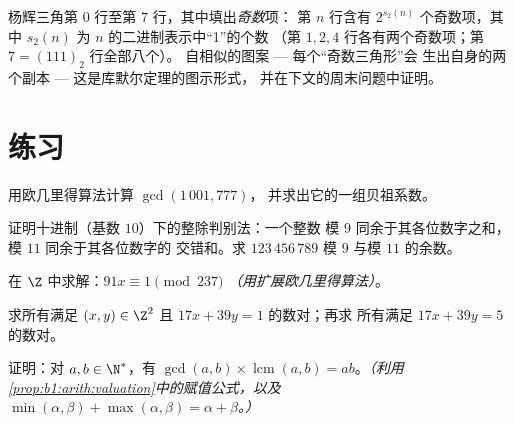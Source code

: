 \begin{omfigure}

{\small 杨辉三角第 $0$ 行至第 $7$ 行，其中填出\emph{奇数}项：
第 $n$ 行含有 $2^{s_2(n)}$ 个奇数项，其中
$s_2(n)$ 为 $n$ 的二进制表示中“1”的个数
（第 $1, 2, 4$ 行各有两个奇数项；第 $7 = (111)_2$ 行全部八个）。
自相似的图案 --- 每个“奇数三角形”会
生出自身的两个副本 --- 这是库默尔定理的图示形式，
并在下文的周末问题中证明。}
\end{omfigure}

\section{练习}

\begin{exercise}[$\star$]\label{exo:b1:arith:1}
用欧几里得算法计算 $\gcd(1\,001, 777)$，
并求出它的一组贝祖系数。
\end{exercise}

\begin{exercise}[$\star$]\label{exo:b1:arith:2}
证明十进制（基数 $10$）下的整除判别法：一个整数
模 $9$ 同余于其各位数字之和，模 $11$ 同余于其各位数字的
交错和。求 $123\,456\,789$ 模 $9$ 与模 $11$ 的余数。
\end{exercise}

\begin{exercise}[$\star$]\label{exo:b1:arith:3}
在 $\Z$ 中求解：$91x \equiv 1 \pmod{237}$ \emph{（用扩展欧几里得算法）}。
\end{exercise}

\begin{exercise}[$\star$]\label{exo:b1:arith:4}
求所有满足 $(x, y) \in \Z^2$ 且 $17x + 39y = 1$ 的数对；再求
所有满足 $17 x + 39 y = 5$ 的数对。
\end{exercise}

\begin{exercise}[$\star\star$]\label{exo:b1:arith:5}
证明：对 $a, b \in \N^*$，有 $\gcd(a,b) \times
\operatorname{lcm}(a,b) = ab$。\emph{（利用
\cref{prop:b1:arith:valuation}中的赋值公式，以及 $\min(\alpha,\beta) +
\max(\alpha,\beta) = \alpha + \beta$。）}
\end{exercise}

